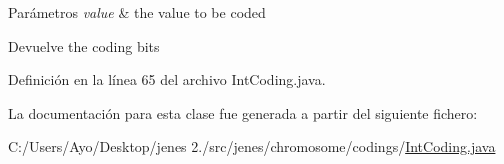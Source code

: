 \begin{DoxyParams}{Parámetros}
{\em value} & the value to be coded \\
\hline
\end{DoxyParams}
\begin{DoxyReturn}{Devuelve}
the coding bits 
\end{DoxyReturn}


Definición en la línea 65 del archivo Int\-Coding.\-java.



La documentación para esta clase fue generada a partir del siguiente fichero\-:\begin{DoxyCompactItemize}
\item 
C\-:/\-Users/\-Ayo/\-Desktop/jenes 2./src/jenes/chromosome/codings/\hyperlink{_int_coding_8java}{Int\-Coding.\-java}\end{DoxyCompactItemize}
